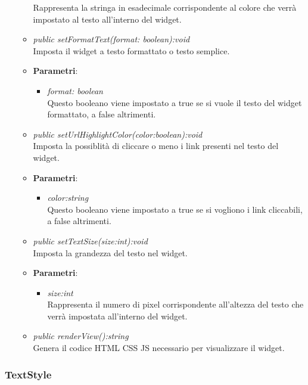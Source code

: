 \begin{itemize}
\begin{itemize}
{\begin{itemize}
		Rappresenta la stringa in esadecimale corrispondente al colore che verrà impostato al testo all'interno del widget.
		\end{itemize}}
	\item \textit{public setFormatText(format: boolean):void}\\
	Imposta il widget a testo formattato o testo semplice.
		\item{\textbf{Parametri}: \begin{itemize}
		\item \textit{format: boolean}\\
		Questo booleano viene impostato a true se si vuole il testo del widget formattato, a false altrimenti.
		\end{itemize}}
	\item \textit{public setUrlHighlightColor(color:boolean):void}\\
	Imposta la possiblità di cliccare o meno i link presenti nel testo del widget.
		\item{\textbf{Parametri}: \begin{itemize}
		\item \textit{color:string}\\
		Questo booleano viene impostato a true se si vogliono i link cliccabili, a false altrimenti.
		\end{itemize}}
	\item \textit{public setTextSize(size:int):void}\\
	Imposta la grandezza del testo nel widget.
		\item{\textbf{Parametri}: \begin{itemize}
		\item \textit{size:int}\\
		Rappresenta il numero di pixel corrispondente all'altezza del testo che verrà impostata all'interno del widget.
		\end{itemize}}
	\item \textit{public renderView():string}\\
	Genera il codice HTML CSS JS necessario per visualizzare il widget.
	\end{itemize}
\end{itemize}

\subsubsection{TextStyle}

